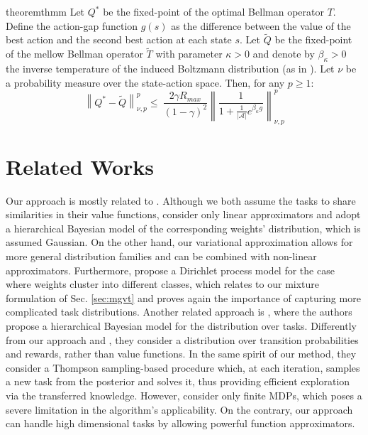 \documentclass{article}
\newcommand{\wt}[1]{\widetilde{#1}}
\newcommand{\norm}[1]{\left\lVert #1 \right\rVert}
\newcommand{\abs}[1]{\left\lvert #1 \right\rvert}
\begin{document}
\begin{restatable}{theorem}{thmm} \label{th:mm}
Let $Q^*$ be the fixed-point of the optimal Bellman operator $T$. Define the action-gap function $g(s)$ as the difference between the value of the best action and the second best action at each state $s$. Let $\wt{Q}$ be the fixed-point of the mellow Bellman operator $\wt{T}$ with parameter $\kappa > 0$ and denote by $\beta_{\kappa} > 0$ the inverse temperature of the induced Boltzmann distribution (as in \cite{}). Let $\nu$ be a probability measure over the state-action space. Then, for any $p \geq 1$:
\begin{equation}
\norm{Q^*-\wt{Q}}_{\nu,p}^p \leq\ \frac{2\gamma R_{max}}{(1-\gamma)^2}\norm{\frac{1}{1 + \frac{1}{\abs{\mathcal{A}}}e^{\beta_{\kappa} g}}}_{\nu,p}^p
\end{equation}
\end{restatable}

\section{Related Works}

Our approach is mostly related to \cite{}. Although we both assume the tasks to share similarities in their value functions, \cite{} consider only linear approximators and adopt a hierarchical Bayesian model of the corresponding weights' distribution, which is assumed Gaussian. On the other hand, our variational approximation allows for more general distribution families and can be combined with non-linear approximators. Furthermore, \cite{} propose a Dirichlet process model for the case where weights cluster into different classes, which relates to our mixture formulation of Sec. \ref{sec:mgvt} and proves again the importance of capturing more complicated task distributions. 
Another related approach is \cite{}, where the authors propose a hierarchical Bayesian model for the distribution over tasks. Differently from our approach and \cite{}, they consider a distribution over transition probabilities and rewards, rather than value functions. In the same spirit of our method, they consider a Thompson sampling-based procedure which, at each iteration, samples a new task from the posterior and solves it, thus providing efficient exploration via the transferred knowledge. However, \cite{} consider only finite MDPs, which poses a severe limitation in the algorithm's applicability. On the contrary, our approach can handle high dimensional tasks by allowing powerful function approximators. 
\end{document}
